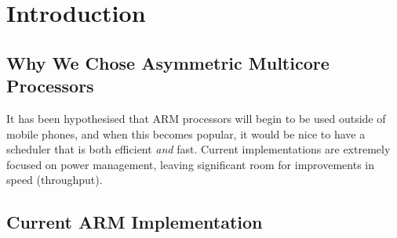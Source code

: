 \section{Introduction}
\subsection{Why We Chose Asymmetric Multicore Processors}
It has been hypothesised that ARM processors will begin to be used outside of mobile phones, and when this becomes popular, it would be nice to have a scheduler that is both efficient \textit{and} fast. Current implementations are extremely focused on power management, leaving significant room for improvements in speed (throughput).

\subsection{Current ARM Implementation}
